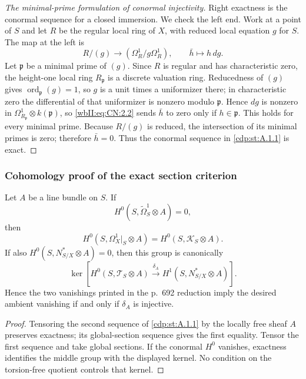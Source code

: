 \begin{proof}[The minimal-prime formulation of conormal injectivity]
Right exactness is the conormal sequence for a closed immersion.  We check
the left end.  Work at a point of $S$ and let $R$ be the regular local ring
of $X$, with reduced local equation $g$ for $S$.  The map at the left is
\[
 R/(g)\longrightarrow (\Omega^1_R/g\Omega^1_R),
 \qquad \bar h\longmapsto h\,dg.
 \tag{W.145}\label{wbII:eq:CN:2.2}
\]
Let $\mathfrak p$ be a minimal prime of $(g)$.  Since $R$ is regular and
has characteristic zero, the height-one local ring $R_{\mathfrak p}$ is a
discrete valuation ring.  Reducedness of $(g)$ gives
$\operatorname{ord}_{\mathfrak p}(g)=1$, so $g$ is a unit times a
uniformizer there; in characteristic zero the differential of that
uniformizer is nonzero modulo $\mathfrak p$.  Hence $dg$ is nonzero in
$\Omega^1_{R_{\mathfrak p}}\otimes k(\mathfrak p)$, so \eqref{wbII:eq:CN:2.2} sends $\bar h$
to zero only if $h\in\mathfrak p$.  This holds for every minimal prime.
Because $R/(g)$ is reduced, the intersection of its minimal primes is zero;
therefore $\bar h=0$.  Thus the conormal sequence in \cref{cdp:st:A.1.1} is exact.
\end{proof}

\subsubsection*{Cohomology proof of the exact section criterion}


Let $A$ be a line bundle on $S$.  If
\[
H^0(S,\widetilde\Omega_S^1\otimes A)=0,
\]
then
\[
H^0(S,\Omega_X^1|_S\otimes A)
=H^0(S,\mathscr K_S\otimes A).
\]
If also $H^0(S,N^*_{S/X}\otimes A)=0$, then this group is canonically
\[
\ker\!\left[
H^0(S,\mathscr T_S\otimes A)
\xrightarrow{\delta_A}H^1(S,N^*_{S/X}\otimes A)
\right].
\]
Hence the two vanishings printed in the p.~692 reduction imply the desired
ambient vanishing if and only if $\delta_A$ is injective.



\begin{proof}
Tensoring the second sequence of
\cref{cdp:st:A.1.1} by the locally free sheaf $A$
preserves exactness; its global-section sequence gives the first equality.
Tensor the first sequence and take global sections.  If the conormal
$H^0$ vanishes, exactness identifies the middle group with the displayed
kernel.  No condition on the torsion-free quotient controls that kernel.
\end{proof}

